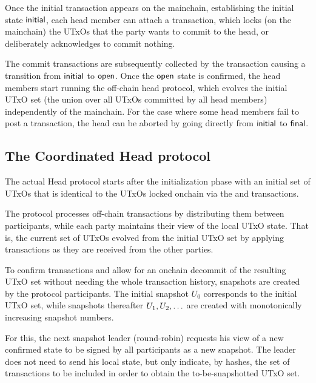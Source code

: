 

Once the initial transaction appears on the mainchain, establishing the initial
state $\mathsf{initial}$, each head member can attach a \mtxCom{} transaction, which
locks (on the mainchain) the UTxOs that the party wants to commit to the head,
or deliberately acknowledges to commit nothing.

The commit transactions are subsequently collected by the \mtxCCom{} transaction
causing a transition from $\mathsf{initial}$ to $\mathsf{open}$. Once the $\mathsf{open}$ state is
confirmed, the head members start running the off-chain head protocol, which
evolves the initial UTxO set (the union over all UTxOs committed by all head
members) independently of the mainchain. For the case where some head members
fail to post a \mtxCom{} transaction, the head can be aborted by going directly
from $\mathsf{initial}$ to $\mathsf{final}$. 
\subsection{The Coordinated Head protocol}

The actual Head protocol starts after the initialization phase with an initial
set of UTxOs that is identical to the UTxOs locked onchain via the \mtxCom{}
and \mtxCCom{} transactions.

The protocol processes off-chain transactions by distributing them between participants,
while each party maintains their view of the local UTxO state. That is, the current
set of UTxOs evolved from the initial UTxO set by applying transactions as they
are received from the other parties.

To confirm transactions and allow for an onchain decommit of the resulting UTxO
set without needing the whole transaction history, snapshots are created by the protocol participants. The initial snapshot $U_{0}$
corresponds to the initial UTxO set, while snapshots thereafter
$U_1,U_2,\ldots$  are created with monotonically increasing snapshot numbers.

For this, the next snapshot leader (round-robin)   requests his view of a new confirmed state to be
signed by all participants as a new snapshot. The leader does not need to send his local state,
but only indicate, by hashes, the set of transactions to be included in order to
obtain the to-be-snapshotted UTxO set. 

